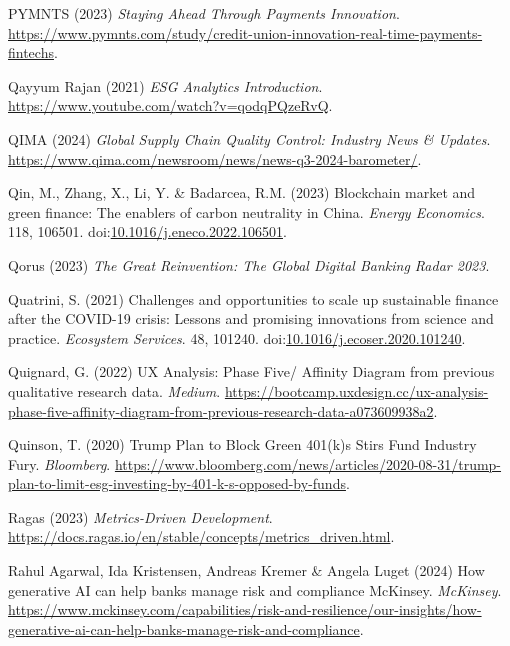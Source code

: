 \documentclass[
  letterpaper,
  DIV=11,
  numbers=noendperiod]{scrartcl}
\newlength{\cslhangindent}
\newenvironment{CSLReferences}[2] %
 {\begin{list}{}{%
  \setlength{\itemindent}{0pt}
  \setlength{\leftmargin}{0pt}
  \setlength{\parsep}{0pt}
  \ifodd #1
   \setlength{\leftmargin}{\cslhangindent}
   \setlength{\itemindent}{-1\cslhangindent}
  \fi
  \setlength{\itemsep}{#2\baselineskip}}}
 {\end{list}}
\begin{document}
\begin{CSLReferences}{0}{1}
PYMNTS (2023) \emph{Staying {Ahead Through Payments Innovation}}.
\url{https://www.pymnts.com/study/credit-union-innovation-real-time-payments-fintechs}.

Qayyum Rajan (2021) \emph{{ESG Analytics Introduction}}.
\url{https://www.youtube.com/watch?v=qodqPQzeRvQ}.

QIMA (2024) \emph{Global {Supply Chain Quality Control}: {Industry News}
\& {Updates}}.
\url{https://www.qima.com/newsroom/news/news-q3-2024-barometer/}.

Qin, M., Zhang, X., Li, Y. \& Badarcea, R.M. (2023) Blockchain market
and green finance: {The} enablers of carbon neutrality in {China}.
\emph{Energy Economics}. 118, 106501.
doi:\href{https://doi.org/10.1016/j.eneco.2022.106501}{10.1016/j.eneco.2022.106501}.

Qorus (2023) \emph{The {Great Reinvention}: {The Global Digital Banking
Radar} 2023}.

Quatrini, S. (2021) Challenges and opportunities to scale up sustainable
finance after the {COVID-19} crisis: {Lessons} and promising innovations
from science and practice. \emph{Ecosystem Services}. 48, 101240.
doi:\href{https://doi.org/10.1016/j.ecoser.2020.101240}{10.1016/j.ecoser.2020.101240}.

Quignard, G. (2022) {UX Analysis}: {Phase Five}/ {Affinity Diagram} from
previous qualitative research data. \emph{Medium}.
\url{https://bootcamp.uxdesign.cc/ux-analysis-phase-five-affinity-diagram-from-previous-research-data-a073609938a2}.

Quinson, T. (2020) Trump {Plan} to {Block Green} 401(k)s {Stirs Fund
Industry Fury}. \emph{Bloomberg}.
\url{https://www.bloomberg.com/news/articles/2020-08-31/trump-plan-to-limit-esg-investing-by-401-k-s-opposed-by-funds}.

Ragas (2023) \emph{Metrics-{Driven Development}}.
\url{https://docs.ragas.io/en/stable/concepts/metrics_driven.html}.

Rahul Agarwal, Ida Kristensen, Andreas Kremer \& Angela Luget (2024) How
generative {AI} can help banks manage risk and compliance {\textbar}
{McKinsey}. \emph{McKinsey}.
\url{https://www.mckinsey.com/capabilities/risk-and-resilience/our-insights/how-generative-ai-can-help-banks-manage-risk-and-compliance}.


\end{CSLReferences}
\end{document}

